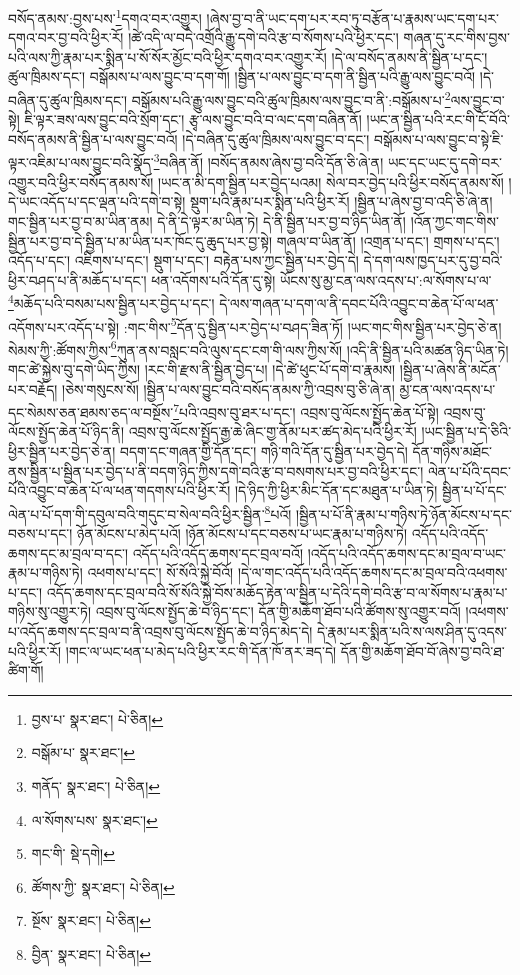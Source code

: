 བསོད་ནམས་:བྱས་པས་\footnote{བྱས་པ་  སྣར་ཐང་།  པེ་ཅིན། }དགའ་བར་འགྱུར། །ཞེས་བྱ་བ་ནི་ཡང་དག་པར་རབ་ཏུ་བརྩོན་པ་རྣམས་ཡང་དག་པར་དགའ་བར་བྱ་བའི་ཕྱིར་རོ། །ཚེ་འདི་ལ་བདེ་འགྲོའི་རྒྱུ་དགེ་བའི་རྩ་བ་སོགས་པའི་ཕྱིར་དང་། གཞན་དུ་རང་གིས་བྱས་པའི་ལས་ཀྱི་རྣམ་པར་སྨིན་པ་སོ་སོར་མྱོང་བའི་ཕྱིར་དགའ་བར་འགྱུར་རོ། །དེ་ལ་བསོད་ནམས་ནི་སྦྱིན་པ་དང་། ཚུལ་ཁྲིམས་དང་། བསྒོམས་པ་ལས་བྱུང་བ་དག་གོ། །སྦྱིན་པ་ལས་བྱུང་བ་དག་ནི་སྦྱིན་པའི་རྒྱུ་ལས་བྱུང་བའོ། །དེ་བཞིན་དུ་ཚུལ་ཁྲིམས་དང་། བསྒོམས་པའི་རྒྱུ་ལས་བྱུང་བའི་ཚུལ་ཁྲིམས་ལས་བྱུང་བ་ནི་:བསྒོམས་པ་\footnote{བསྒོམ་པ་  སྣར་ཐང་། }ལས་བྱུང་བ་སྟེ། ཇི་ལྟར་ཟས་ལས་བྱུང་བའི་སྲོག་དང་། རྩྭ་ལས་བྱུང་བའི་བ་ལང་དག་བཞིན་ནོ། །ཡང་ན་སྦྱིན་པའི་རང་གི་ངོ་བོའི་བསོད་ནམས་ནི་སྦྱིན་པ་ལས་བྱུང་བའོ། །དེ་བཞིན་དུ་ཚུལ་ཁྲིམས་ལས་བྱུང་བ་དང་། བསྒོམས་པ་ལས་བྱུང་བ་སྟེ་ཇི་ལྟར་འཇིམ་པ་ལས་བྱུང་བའི་སྣོད་\footnote{གནོད་  སྣར་ཐང་།  པེ་ཅིན། }བཞིན་ནོ། །བསོད་ནམས་ཞེས་བྱ་བའི་དོན་ཅི་ཞེ་ན། ཡང་དང་ཡང་དུ་དགེ་བར་འགྱུར་བའི་ཕྱིར་བསོད་ནམས་སོ། །ཡང་ན་མི་དག་སྦྱིན་པར་བྱེད་པའམ། སེལ་བར་བྱེད་པའི་ཕྱིར་བསོད་ནམས་སོ། །དེ་ཡང་འདོད་པ་དང་ལྡན་པའི་དགེ་བ་སྟེ། སྡུག་པའི་རྣམ་པར་སྨིན་པའི་ཕྱིར་རོ། །སྦྱིན་པ་ཞེས་བྱ་བ་འདི་ཅི་ཞེ་ན། གང་སྦྱིན་པར་བྱ་བ་མ་ཡིན་ནམ། དེ་ནི་དེ་ལྟར་མ་ཡིན་ཏེ། དེ་ནི་སྦྱིན་པར་བྱ་བ་ཉིད་ཡིན་ནོ། །འོན་ཀྱང་གང་གིས་སྦྱིན་པར་བྱ་བ་དེ་སྦྱིན་པ་མ་ཡིན་པར་ཁོང་དུ་ཆུད་པར་བྱ་སྟེ། གཞལ་བ་ཡིན་ནོ། །འགྲན་པ་དང་། གྲགས་པ་དང་། འདོད་པ་དང་། འཇིགས་པ་དང་། སྡུག་པ་དང་། བརྟེན་པས་ཀྱང་སྦྱིན་པར་བྱེད་དེ། དེ་དག་ལས་ཁྱད་པར་དུ་བྱ་བའི་ཕྱིར་བཤད་པ་ནི་མཆོད་པ་དང་། ཕན་འདོགས་པའི་དོན་དུ་སྟེ། ཡོངས་སུ་མྱ་ངན་ལས་འདས་པ་:ལ་སོགས་པ་ལ་\footnote{ལ་སོགས་པས་  སྣར་ཐང་། }མཆོད་པའི་བསམ་པས་སྦྱིན་པར་བྱེད་པ་དང་། དེ་ལས་གཞན་པ་དག་ལ་ནི་དབང་པོའི་འབྱུང་བ་ཆེན་པོ་ལ་ཕན་འདོགས་པར་འདོད་པ་སྟེ། :གང་གིས་\footnote{གང་གི་  སྡེ་དགེ། }དོན་དུ་སྦྱིན་པར་བྱེད་པ་བཤད་ཟིན་ཏོ། །ཡང་གང་གིས་སྦྱིན་པར་བྱེད་ཅེ་ན། སེམས་ཀྱི་:ཚོགས་ཀྱིས་\footnote{ཚོགས་ཀྱི་  སྣར་ཐང་།  པེ་ཅིན། }ཀུན་ནས་བསླང་བའི་ལུས་དང་ངག་གི་ལས་ཀྱིས་སོ། །འདི་ནི་སྦྱིན་པའི་མཚན་ཉིད་ཡིན་ཏེ། གང་ཚེ་སྐྱེས་བུ་དགེ་ཡིད་ཀྱིས། །རང་གི་རྫས་ནི་སྦྱིན་བྱེད་པ། །དེ་ཚེ་ཕུང་པོ་དགེ་བ་རྣམས། །སྦྱིན་པ་ཞེས་ནི་མངོན་པར་བརྗོད། །ཅེས་གསུངས་སོ། །སྦྱིན་པ་ལས་བྱུང་བའི་བསོད་ནམས་ཀྱི་འབྲས་བུ་ཅི་ཞེ་ན། མྱ་ངན་ལས་འདས་པ་དང་སེམས་ཅན་ཐམས་ཅད་ལ་བསྔོས་\footnote{སྔོས་  སྣར་ཐང་།  པེ་ཅིན། }པའི་འབྲས་བུ་ཐར་པ་དང་། འབྲས་བུ་ལོངས་སྤྱོད་ཆེན་པོ་སྟེ། འབྲས་བུ་ལོངས་སྤྱོད་ཆེན་པོ་ཉིད་ནི། འབྲས་བུ་ལོངས་སྤྱོད་རྒྱ་ཆེ་ཞིང་གྱ་ནོམ་པར་ཚད་མེད་པའི་ཕྱིར་རོ། །ཡང་སྦྱིན་པ་དེ་ཅིའི་ཕྱིར་སྦྱིན་པར་བྱེད་ཅེ་ན། བདག་དང་གཞན་གྱི་དོན་དང་། གཉི་གའི་དོན་དུ་སྦྱིན་པར་བྱེད་དེ། དོན་གཉིས་མཐོང་ནས་སྦྱིན་པ་སྦྱིན་པར་བྱེད་པ་ནི་བདག་ཉིད་ཀྱིས་དགེ་བའི་རྩ་བ་བསགས་པར་བྱ་བའི་ཕྱིར་དང་། ལེན་པ་པོའི་དབང་པོའི་འབྱུང་བ་ཆེན་པོ་ལ་ཕན་གདགས་པའི་ཕྱིར་རོ། །དེ་ཉིད་ཀྱི་ཕྱིར་མིང་དོན་དང་མཐུན་པ་ཡིན་ཏེ། སྦྱིན་པ་པོ་དང་ལེན་པ་པོ་དག་གི་དབུལ་བའི་གདུང་བ་སེལ་བའི་ཕྱིར་སྦྱིན་\footnote{བྱིན་  སྣར་ཐང་།  པེ་ཅིན། }པའོ། །སྦྱིན་པ་པོ་ནི་རྣམ་པ་གཉིས་ཏེ་ཉོན་མོངས་པ་དང་བཅས་པ་དང་། ཉོན་མོངས་པ་མེད་པའོ། །ཉོན་མོངས་པ་དང་བཅས་པ་ཡང་རྣམ་པ་གཉིས་ཏེ། འདོད་པའི་འདོད་ཆགས་དང་མ་བྲལ་བ་དང་། འདོད་པའི་འདོད་ཆགས་དང་བྲལ་བའོ། །འདོད་པའི་འདོད་ཆགས་དང་མ་བྲལ་བ་ཡང་རྣམ་པ་གཉིས་ཏེ། འཕགས་པ་དང་། སོ་སོའི་སྐྱེ་བོའོ། །དེ་ལ་གང་འདོད་པའི་འདོད་ཆགས་དང་མ་བྲལ་བའི་འཕགས་པ་དང་། འདོད་ཆགས་དང་བྲལ་བའི་སོ་སོའི་སྐྱེ་བོས་མཆོད་རྟེན་ལ་སྦྱིན་པ་དེའི་དགེ་བའི་རྩ་བ་ལ་སོགས་པ་རྣམ་པ་གཉིས་སུ་འགྱུར་ཏེ། འབྲས་བུ་ལོངས་སྤྱོད་ཆེ་བ་ཉིད་དང་། དོན་གྱི་མཆོག་ཐོབ་པའི་ཚོགས་སུ་འགྱུར་བའོ། །འཕགས་པ་འདོད་ཆགས་དང་བྲལ་བ་ནི་འབྲས་བུ་ལོངས་སྤྱོད་ཆེ་བ་ཉིད་མེད་དེ། དེ་རྣམ་པར་སྨིན་པའི་ས་ལས་ཤིན་དུ་འདས་པའི་ཕྱིར་རོ། །གང་ལ་ཡང་ཕན་པ་མེད་པའི་ཕྱིར་རང་གི་དོན་ཁོ་ནར་ཟད་དེ། དོན་གྱི་མཆོག་ཐོབ་བོ་ཞེས་བྱ་བའི་ཐ་ཚིག་གོ། 